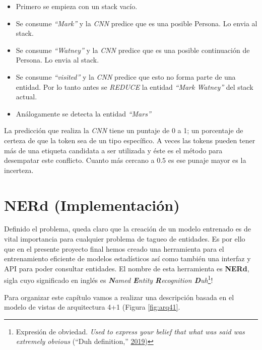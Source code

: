 \documentclass[12pt,a4paper,]{scrartcl}
\providecommand{\tightlist}{%
  \setlength{\itemsep}{0pt}\setlength{\parskip}{0pt}}
\let\rmarkdownfootnote\footnote%
\def\footnote{\protect\rmarkdownfootnote}
\begin{document}
\begin{itemize}
\tightlist
\item
  Primero se empieza con un stack vacío.
\item
  Se consume \emph{\enquote{Mark}} y la \emph{CNN} predice que es una posible Persona. Lo envia al stack.
\item
  Se consume \emph{\enquote{Watney}} y la \emph{CNN} predice que es una posible continuación de Persona. Lo envia al stack.
\item
  Se consume \emph{\enquote{visited}} y la \emph{CNN} predice que esto no forma parte de una entidad. Por lo tanto antes se \emph{REDUCE} la entidad \emph{\enquote{Mark Watney}} del stack actual.
\item
  Análogamente se detecta la entidad \emph{\enquote{Mars}}
\end{itemize}

La predicción que realiza la \emph{CNN} tiene un puntaje de 0 a 1; un porcentaje de certeza de que la token sea de un tipo específico. A veces las tokens pueden tener más de una etiqueta candidata a ser utilizada y éste es el método para desempatar este conflicto. Cuanto más cercano a \(0.5\) es ese punaje mayor es la incerteza.

\newpage

\hypertarget{implementation}{%
\section{NERd (Implementación)}\label{implementation}}

Definido el problema, queda claro que la creación de un modelo entrenado es de vital importancia para cualquier problema de tagueo de entidades.
Es por ello que en el presente proyecto final hemos creado una herramienta para el entrenamiento eficiente de modelos estadísticos así como también una interfaz y API para poder consultar entidades.
El nombre de esta herramienta es \textbf{NERd}, sigla cuyo significado en inglés es \emph{\textbf{N}amed \textbf{E}ntity \textbf{R}ecognition \textbf{D}uh}\footnote{Expresión de obviedad. \emph{Used to express your belief that what was said was extremely obvious} (``Duh definition,'' \protect\hyperlink{ref-cambridge_duh}{2019})}!

Para organizar este capítulo vamos a realizar una descripción basada en el modelo de vistas de arquitectura 4+1 (Figura \ref{fig:arq41}.
\end{document}
